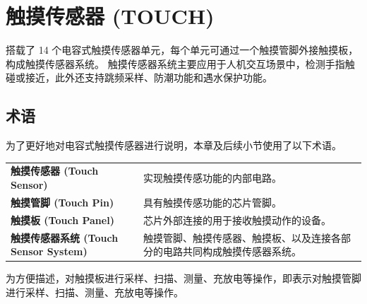 \documentclass[main\_\_CN.tex]{subfiles}
\begin{document}
\setchineseformatting


\ifglobal
\else
    \clearpage
    \listoftodos
    \listofdonetodos
    \tableofcontents
\fi




\hypertarget{tchsen}{}
\chapter{触摸传感器 (TOUCH)}
\label{mod:tchsen}

\chipname{} 搭载了 14 个电容式触摸传感器单元，每个单元可通过一个触摸管脚外接触摸板，构成触摸传感器系统。\chipname{} 触摸传感器系统主要应用于人机交互场景中，检测手指触碰或接近，此外还支持跳频采样、防潮功能和遇水保护功能。

\section{术语}
\label{sec:tchsen-term}

为了更好地对电容式触摸传感器进行说明，本章及后续小节使用了以下术语。 

\begin{longtable}[c]{ R{7cm} p{9cm} }
\textbf{触摸传感器 (Touch Sensor)}  & 实现触摸传感功能的内部电路。 \\
\textbf{触摸管脚 (Touch Pin)}    & 具有触摸传感功能的芯片管脚。 \\
\textbf{触摸板 (Touch Panel)}  & 芯片外部连接的用于接收触摸动作的设备。\\
\textbf{触摸传感器系统 (Touch Sensor System)}  & 触摸管脚、触摸传感器、触摸板、以及连接各部分的电路共同构成触摸传感器系统。 \\
\end{longtable}

\vspace{-1em}
\begin{tiplisting}
为方便描述，对触摸板进行采样、扫描、测量、充放电等操作，即表示对触摸管脚进行采样、扫描、测量、充放电等操作。
\end{tiplisting}
\vspace{-2em}


\end{document}
